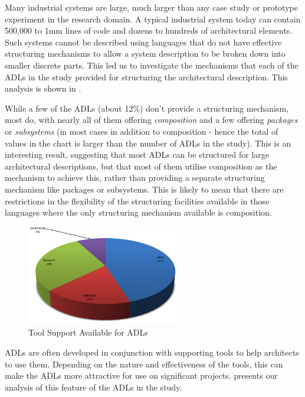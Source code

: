 Many industrial systems are large, much larger than any case study or prototype experiment in the research domain.  A typical industrial system today can contain 500,000 to 1mm lines of code and dozens to hundreds of architectural elements.  Such systems cannot be described using languages that do not have effective structuring mechanisms to allow a system description to be broken down into smaller discrete parts.  This led us to investigate the mechanisms that each of the ADLs in the study provided for structuring the architectural description.  This analysis is shown in .

While a few of the ADLs (about 12\%) don't provide a structuring mechanism, most do, with nearly all of them offering \emph{composition} and a few offering \emph{packages} or \emph{subsystems} (in most cases in addition to composition - hence the total of values in the chart is larger than the number of ADLs in the study).
This is an interesting result, suggesting that most ADLs can be structured for large architectural descriptions, but that most of them utilise composition as the mechanism to achieve this, rather than providing a separate structuring mechanism like packages or subsystems.  This is likely to mean that there are restrictions in the flexibility of the structuring facilities available in those languages where the only structuring mechanism available is composition.

\begin{figure}
\centering
\includegraphics[width=0.6\textwidth]{Figures/litreview-adl-toolsupport}
\caption{Tool Support Available for ADLs}
\label{figure:litreview-adl-toolsupport}
\end{figure}

ADLs are often developed in conjunction with supporting tools to help architects to use them.  Depending on the nature and effectiveness of the tools, this can make the ADLs more attractive for use on significant projects.  presents our analysis of this feature of the ADLs in the study.

